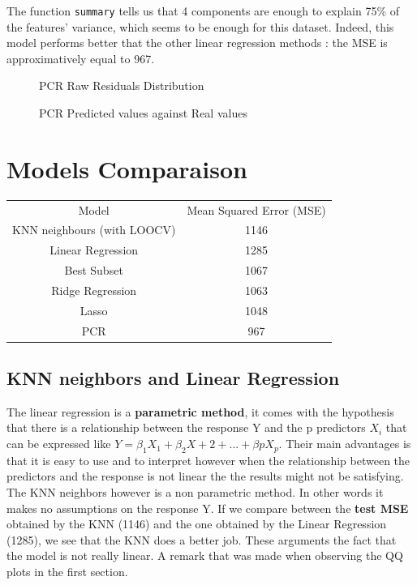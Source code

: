 \documentclass[]{report}
\newcommand{\inputtikz}[2]{%
	\scalebox{#1}{}  
}
\begin{document}
The function \texttt{summary} tells us that 4 components are enough to explain 75\% of the features' variance, which seems to be enough for this dataset. Indeed, this model performs better that the other linear regression methods : the MSE is approximatively equal to 967. 

\begin{figure}[!h]
	\centering
	\inputtikz{0.5}{Figures/pcr_hist.tex}
	\caption{PCR Raw Residuals Distribution}
	\label{fig:pcr_hist}
\end{figure}

\begin{figure}[!h]
	\centering
	\inputtikz{0.5}{Figures/pcr_predicted.tex}
	\caption{PCR Predicted values against Real values}
	\label{fig:pcr_predicted}
\end{figure}


\section{Models Comparaison}
\begin{tabular}{c c}
	Model & Mean Squared Error (MSE) \\
	KNN neighbours (with LOOCV) & 1146\\ 
	Linear Regression & 1285\\
	Best Subset	& 1067\\
	Ridge Regression & 1063 \\	
	Lasso & 1048\\
	PCR & 967 \\
\end{tabular}
\subsection{KNN neighbors and Linear Regression}
 The linear regression is a \textbf{parametric method}, it comes with the hypothesis that there is a relationship between the response Y and the p predictors $X_{i}$ that can be expressed like $Y =\beta_{1}X_{1}+\beta_{2}X+{2}+...+\beta{p}X_{p}$. Their main advantages is that it is easy to use and to interpret however when the relationship between the predictors and the response is not linear the the results might not be satisfying. The KNN neighbors however is a non parametric method. In other words it makes no assumptions on the response Y. If we compare between the \textbf{test MSE} obtained by the KNN (1146) and the one obtained by the Linear Regression (1285), we see that the KNN does a better job. These arguments the fact that the model is not really linear. A remark that was made when observing the QQ plots in the first section. 
\end{document}
